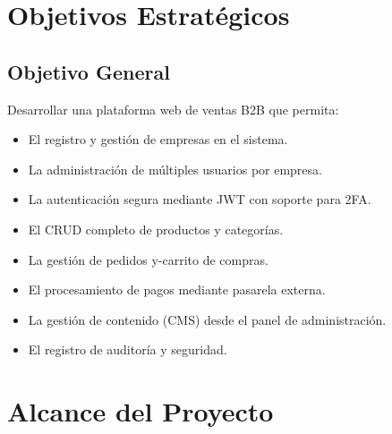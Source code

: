 \documentclass[12pt,a4paper,oneside]{book}
\begin{document}
\section{Objetivos Estratégicos}

\subsection{Objetivo General}
Desarrollar una plataforma web de ventas B2B que permita:
\begin{itemize}
    \item El registro y gestión de empresas en el sistema.
    \item La administración de múltiples usuarios por empresa.
    \item La autenticación segura mediante JWT con soporte para 2FA.
    \item El CRUD completo de productos y categorías.
    \item La gestión de pedidos y-carrito de compras.
    \item El procesamiento de pagos mediante pasarela externa.
    \item La gestión de contenido (CMS) desde el panel de administración.
    \item El registro de auditoría y seguridad.
\end{itemize}

\section{Alcance del Proyecto}
\end{document}
